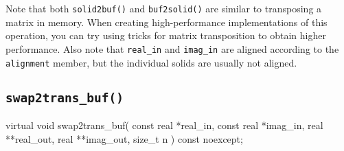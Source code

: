 \documentclass{scrbook}
\begin{document}
Note that both \lstinline|solid2buf()| and \lstinline|buf2solid()| are similar
to transposing a matrix in memory. When creating high-performance
implementations of this operation, you can try using tricks for matrix
transposition to obtain higher performance. Also note that \lstinline|real_in|
and \lstinline|imag_in| are aligned according to the \lstinline|alignment|
member, but the individual solids are usually not aligned.


\subsection{\texorpdfstring{\lstinline|swap2trans_buf()|}{swap2trans_buf}}
\begin{cppcode*}
virtual void swap2trans_buf( const real  *real_in,  const real  *imag_in,
                                   real **real_out,       real **imag_out,
                                   size_t n ) const noexcept;
\end{cppcode*}
\end{document}
